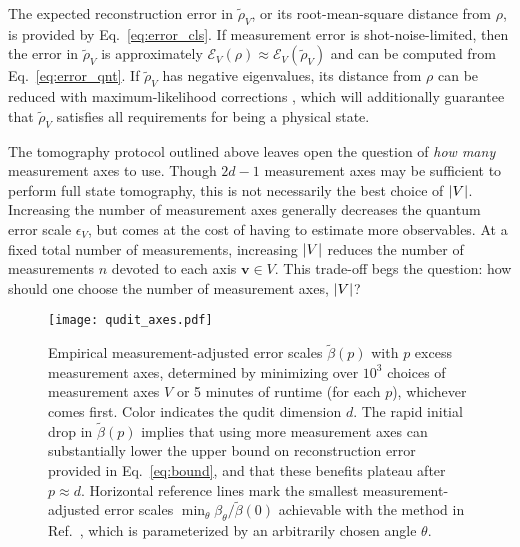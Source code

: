 \documentclass[nofootinbib,twocolumn]{revtex4-1}
\newcommand{\p}[1]{\left(#1\right)} %
\newcommand{\E}{\mathcal{E}}
\begin{document}
The expected reconstruction error in $\tilde\rho_V$, or its root-mean-square distance from $\rho$, is provided by Eq.~\eqref{eq:error_cls}.
If measurement error is shot-noise-limited, then the error in $\tilde\rho_V$ is approximately $\E_V\p{\rho}\approx\E_V\p{\tilde\rho_V}$ and can be computed from Eq.~\eqref{eq:error_qnt}.
If $\tilde\rho_V$ has negative eigenvalues, its distance from $\rho$ can be reduced with maximum-likelihood corrections \cite{smolin2012efficient}, which will additionally guarantee that $\tilde\rho_V$ satisfies all requirements for being a physical state.

The tomography protocol outlined above leaves open the question of {\it how many} measurement axes to use.
Though $2d-1$ measurement axes may be sufficient to perform full state tomography, this is not necessarily the best choice of $\abs{V}$.
Increasing the number of measurement axes generally decreases the quantum error scale $\epsilon_V$, but comes at the cost of having to estimate more observables.
At a fixed total number of measurements, increasing $\abs{V}$ reduces the number of measurements $n$ devoted to each axis $\bm v\in V$.
This trade-off begs the question: how should one choose the number of measurement axes, $\abs{V}$?

\begin{figure}
  \centering
  \texttt{[image: qudit\_axes.pdf]}
  \caption{Empirical measurement-adjusted error scales $\tilde\beta(p)$ with $p$ excess measurement axes, determined by minimizing over $10^3$ choices of measurement axes $V$ or 5 minutes of runtime (for each $p$), whichever comes first.
    Color indicates the qudit dimension $d$.
    The rapid initial drop in $\tilde\beta(p)$ implies that using more measurement axes can substantially lower the upper bound on reconstruction error provided in Eq.~\eqref{eq:bound}, and that these benefits plateau after $p\approx d$.
    Horizontal reference lines mark the smallest measurement-adjusted error scales $\min_\theta\beta_\theta/\tilde\beta(0)$ achievable with the method in Ref.~\cite{newton1968measurability}, which is parameterized by an arbitrarily chosen angle $\theta$.}
  \label{fig:axes}
\end{figure}
\end{document}
